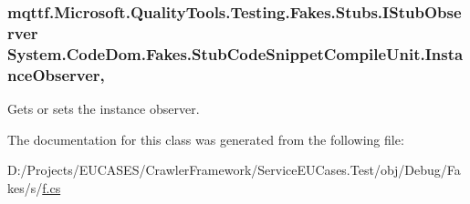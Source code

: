 \hypertarget{class_system_1_1_code_dom_1_1_fakes_1_1_stub_code_snippet_compile_unit_aeaa9a94db004229c99e45412fdcff0d7}{
\subsubsection[{Instance\-Observer}]{\setlength{\rightskip}{0pt plus 5cm}mqttf.\-Microsoft.\-Quality\-Tools.\-Testing.\-Fakes.\-Stubs.\-I\-Stub\-Observer System.\-Code\-Dom.\-Fakes.\-Stub\-Code\-Snippet\-Compile\-Unit.\-Instance\-Observer\hspace{0.3cm}{\ttfamily [get]}, {\ttfamily [set]}}}\label{class_system_1_1_code_dom_1_1_fakes_1_1_stub_code_snippet_compile_unit_aeaa9a94db004229c99e45412fdcff0d7}


Gets or sets the instance observer.



The documentation for this class was generated from the following file\-:\begin{DoxyCompactItemize}
\item 
D\-:/\-Projects/\-E\-U\-C\-A\-S\-E\-S/\-Crawler\-Framework/\-Service\-E\-U\-Cases.\-Test/obj/\-Debug/\-Fakes/s/\hyperlink{s_2f_8cs}{f.\-cs}\end{DoxyCompactItemize}
